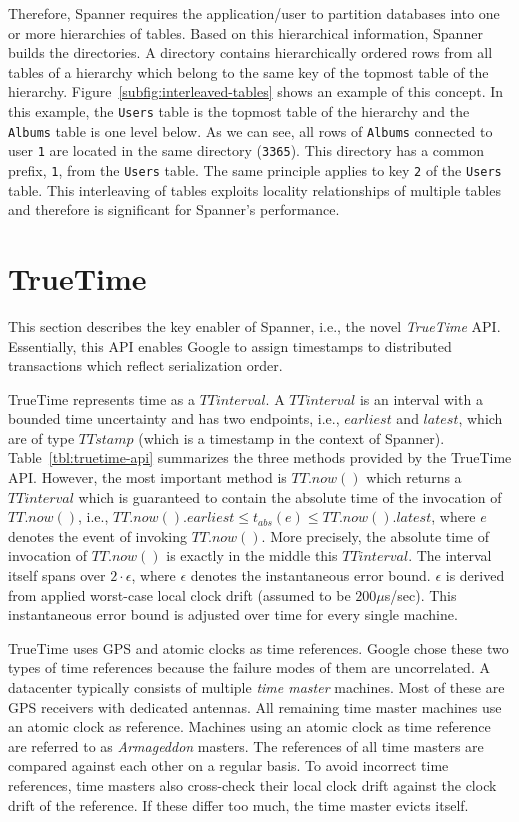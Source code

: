 \documentclass[onecolumn, a4paper, 10pt]{article}
\begin{document}
Therefore, Spanner requires the application/user to partition databases into
one or more hierarchies of tables. Based on this hierarchical information, Spanner
builds the directories. A directory contains hierarchically ordered rows from
all tables of a hierarchy which belong to the same key of the topmost table of
the hierarchy. Figure~\ref{subfig:interleaved-tables} shows an example of this
concept. In this example, the \texttt{Users} table is the topmost table of the
hierarchy and the \texttt{Albums} table is one level below. As we can see, all
rows of \texttt{Albums} connected to user \texttt{1} are located in the same
directory (\texttt{3365}). This directory has a common prefix, \texttt{1},
from the \texttt{Users} table. The same principle applies to key \texttt{2}
of the \texttt{Users} table. This interleaving of tables exploits locality
relationships of multiple tables and therefore is significant for Spanner's
performance.

\section{TrueTime}
\label{sec:truetime}

This section describes the key enabler of Spanner, i.e., the novel \emph{TrueTime}
API. Essentially, this API enables Google to assign timestamps to distributed
transactions which reflect serialization order.

TrueTime represents time as a $TTinterval$. A $TTinterval$ is an interval with a
bounded time uncertainty and has two endpoints, i.e., $earliest$ and $latest$,
which are of type $TTstamp$ (which is a timestamp in the context of Spanner).
Table~\ref{tbl:truetime-api} summarizes the three methods provided by the TrueTime
API. However, the most important method is $TT.now()$ which returns a $TTinterval$
which is guaranteed to contain the absolute time of the invocation of $TT.now()$,
i.e., $TT.now().earliest \leq t_{abs}(e) \leq TT.now().latest$, where $e$ denotes
the event of invoking $TT.now()$. More precisely, the absolute time of invocation
of $TT.now()$ is exactly in the middle this $TTinterval$. The interval itself
spans over $2\cdot\epsilon$, where $\epsilon$ denotes the instantaneous error
bound. $\epsilon$ is derived from applied worst-case local clock drift (assumed
to be $200\mu$s/sec). This instantaneous error bound is adjusted over time for
every single machine.

TrueTime uses GPS and atomic clocks as time references. Google chose these two
types of time references because the failure modes of them are uncorrelated. A
datacenter typically consists of multiple \emph{time master} machines. Most of
these are GPS receivers with dedicated antennas. All remaining time master
machines use an atomic clock as reference. Machines using an atomic clock as time
reference are referred to as \emph{Armageddon} masters. The references of all time
masters are compared against each other on a regular basis. To avoid incorrect
time references, time masters also cross-check their local clock drift against
the clock drift of the reference. If these differ too much, the time master evicts
itself.
\end{document}
